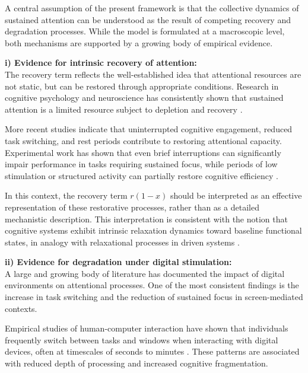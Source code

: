 \documentclass[preprint,12pt]{elsarticle}
\begin{document}
A central assumption of the present framework is that the collective dynamics of sustained attention can be understood as the result of competing recovery and degradation processes. While the model is formulated at a macroscopic level, both mechanisms are supported by a growing body of empirical evidence.

\vspace{0.4cm}


\textbf{i) Evidence for intrinsic recovery of attention:}
\\

The recovery term reflects the well-established idea that attentional resources are not static, but can be restored through appropriate conditions. Research in cognitive psychology and neuroscience has consistently shown that sustained attention is a limited resource subject to depletion and recovery \cite{kahneman,posner}.

More recent studies indicate that uninterrupted cognitive engagement, reduced task switching, and rest periods contribute to restoring attentional capacity. Experimental work has shown that even brief interruptions can significantly impair performance in tasks requiring sustained focus, while periods of low stimulation or structured activity can partially restore cognitive efficiency \cite{leroy}.

In this context, the recovery term $r(1-x)$ should be interpreted as an effective representation of these restorative processes, rather than as a detailed mechanistic description. This interpretation is consistent with the notion that cognitive systems exhibit intrinsic relaxation dynamics toward baseline functional states, in analogy with relaxational processes in driven systems \cite{Hohenberg}.



\vspace{0.5cm}

\noindent
\textbf{ii) Evidence for degradation under digital stimulation:}
\\

A large and growing body of literature has documented the impact of digital environments on attentional processes. One of the most consistent findings is the increase in task switching and the reduction of sustained focus in screen-mediated contexts.

Empirical studies of human-computer interaction have shown that individuals frequently switch between tasks and windows when interacting with digital devices, often at timescales of seconds to minutes \cite{mark1,mark2,mark3}. These patterns are associated with reduced depth of processing and increased cognitive fragmentation.
\end{document}

